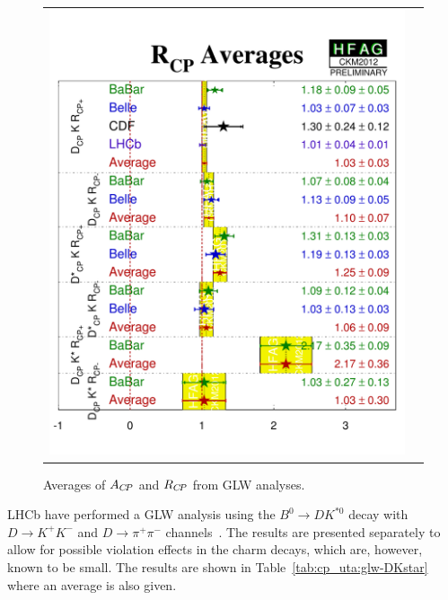 \begin{figure}[htb]
\begin{center}
\begin{tabular}{cc}
{        \includegraphics{figures/cp_uta/R_cp}
      }
    \end{tabular}
 \end{center}
  \vspace{-0.8cm}
  \caption{
    Averages of $A_{C\!P}$ and $R_{C\!P}$ from GLW analyses.
  }
  \label{fig:cp_uta:cus:glw}
\end{figure}

LHCb have performed a GLW analysis using the $B^0 \to DK^{*0}$ decay with $D \to K^+K^-$ and $D \to \pi^+\pi^-$ channels~\cite{Aaij:2014eha}.
The results are presented separately to allow for possible \CP violation effects in the charm decays, which are, however, known to be small.
The results are shown in Table~\ref{tab:cp_uta:glw-DKstar} where an average is also given.




\label{sec:cp_uta:cus:ads}

